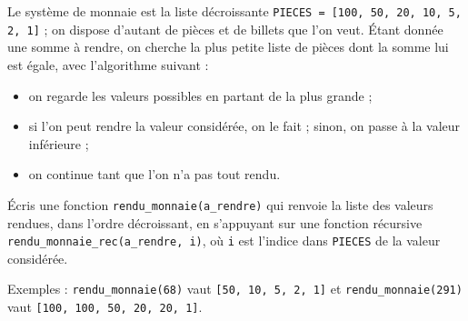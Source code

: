Le système de monnaie est la liste décroissante \texttt{PIECES = [100, 50, 20, 10, 5, 2, 1]} ; on dispose d'autant de pièces et de billets que l'on veut. Étant donnée une somme à rendre, on cherche la plus petite liste de pièces dont la somme lui est égale, avec l'algorithme suivant :
\begin{itemize}
\item on regarde les valeurs possibles en partant de la plus grande ;
\item si l'on peut rendre la valeur considérée, on le fait ; sinon, on passe à la valeur inférieure ;
\item on continue tant que l'on n'a pas tout rendu.
\end{itemize}
Écris une fonction \texttt{rendu\_monnaie(a\_rendre)} qui renvoie la liste des valeurs rendues, dans l'ordre décroissant, en s'appuyant sur une fonction récursive \texttt{rendu\_monnaie\_rec(a\_rendre, i)}, où \texttt{i} est l'indice dans \texttt{PIECES} de la valeur considérée.

Exemples : \texttt{rendu\_monnaie(68)} vaut \texttt{[50, 10, 5, 2, 1]} et \texttt{rendu\_monnaie(291)} vaut \texttt{[100, 100, 50, 20, 20, 1]}.
